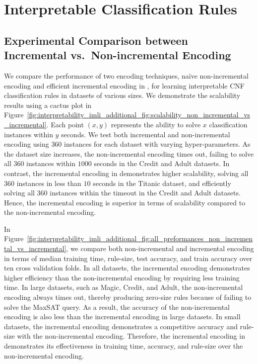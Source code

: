 \chapter{Interpretable Classification Rules}

\section{Experimental Comparison between Incremental vs.\ Non-incremental  Encoding}
We compare the performance of two encoding techniques, na\"ive non-incremental encoding and efficient incremental encoding in {\imli}, for learning interpretable CNF classification rules in datasets of various sizes. We demonstrate the scalability results using a cactus plot in Figure~\ref{fig:interpretability_imli_additional_fig:scalability_non_incremental_vs_incremental}. Each point $ (x, y) $ represents the ability to solve $ x $ classification instances within $ y $ seconds. We test both incremental and non-incremental encoding using $ 360 $ instances for each dataset with varying hyper-parameters. As the dataset size increases, the non-incremental encoding times out, failing to solve all $ 360 $ instances within $ 1000 $ seconds in the Credit and Adult datasets. In contrast, the incremental encoding in {\imli} demonstrates higher scalability, solving all $ 360 $ instances in less than $ 10 $ seconds in the Titanic dataset, and efficiently solving all $ 360 $ instances within the timeout in the Credit and Adult datasets. Hence, the incremental encoding is superior in terms of scalability compared to the non-incremental encoding.

In Figure~\ref{fig:interpretability_imli_additional_fig:all_preformances_non_incremental_vs_incremental}, we compare both non-incremental and incremental encoding in terms of median training time, rule-size, test accuracy, and train accuracy over ten cross validation folds. In all datasets, the incremental encoding demonstrates higher efficiency than the non-incremental encoding by requiring less training time. In large datasets, such as Magic, Credit, and Adult, the non-incremental encoding always times out, thereby producing zero-size rules because of failing to solve the MaxSAT query. As a result, the accuracy of the non-incremental encoding is also less than the incremental encoding in large datasets. In small datasets, the incremental encoding demonstrates a competitive accuracy and rule-size with the non-incremental encoding. Therefore, the incremental encoding in {\imli} demonstrates its effectiveness in training time, accuracy, and rule-size over the non-incremental encoding.


